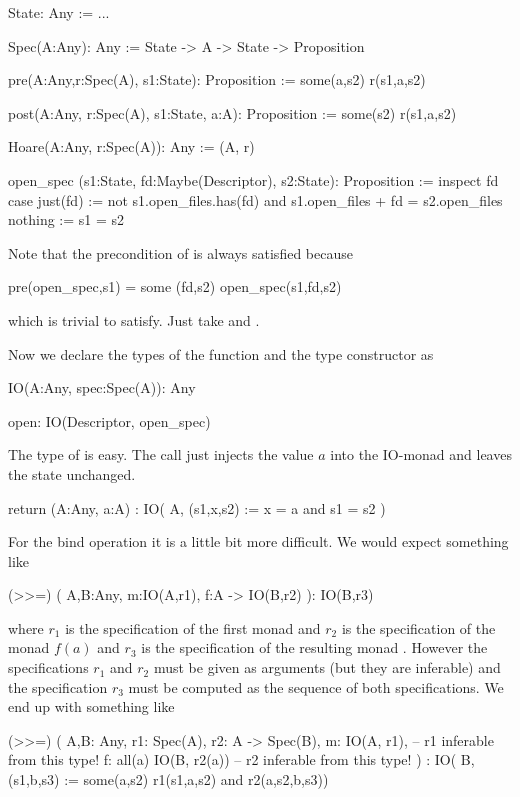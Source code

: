 \begin{alba}
  State: Any := ...

  Spec(A:Any): Any :=  State -> A -> State -> Proposition

  pre(A:Any,r:Spec(A), s1:State): Proposition :=
    some(a,s2) r(s1,a,s2)

  post(A:Any, r:Spec(A), s1:State, a:A): Proposition :=
    some(s2) r(s1,a,s2)


  Hoare(A:Any, r:Spec(A)): Any := (A, r)

  open_spec (s1:State, fd:Maybe(Descriptor), s2:State): Proposition :=
    inspect fd case
      just(fd) :=
        not s1.open_files.has(fd)
        and
        s1.open_files + fd = s2.open_files
      nothing :=
        s1 = s2
\end{alba}
Note that the precondition of  is always satisfied because
%
\begin{alba}
   pre(open_spec,s1) = some (fd,s2) open_spec(s1,fd,s2)
\end{alba}
%
which is trivial to satisfy. Just take  and .

Now we declare the types of the function  and the type constructor
 as
%
\begin{alba}
  IO(A:Any, spec:Spec(A)): Any

  open: IO(Descriptor, open_spec)
\end{alba}
%
The type of  is easy. The call  just injects the
value $a$ into the IO-monad and leaves the state unchanged.
%
\begin{alba}
  return (A:Any, a:A)
         : IO( A,
               (s1,x,s2) :=
                   x  = a and
                   s1 = s2 )
\end{alba}
%
For the bind operation it is a little bit more difficult. We would expect
something like
%
\begin{alba}
  (>>=) ( A,B:Any,
          m:IO(A,r1),
          f:A -> IO(B,r2)
        ): IO(B,r3)
\end{alba}
%
where $r_1$ is the specification of the first monad and $r_2$ is the
specification of the monad $f(a)$ and $r_3$ is the specification of the
resulting monad . However the specifications $r_1$ and $r_2$
must be given as arguments (but they are inferable) and the specification
$r_3$ must be computed as the sequence of both specifications. We end up with
something like

%
\begin{alba}
  (>>=) ( A,B: Any, r1: Spec(A), r2: A -> Spec(B),
          m: IO(A, r1),       -- r1 inferable from this type!
          f: all(a)
               IO(B, r2(a))   -- r2 inferable from this type!
        )
        : IO( B,
              (s1,b,s3) :=
                  some(a,s2)
                    r1(s1,a,s2) and
                    r2(a,s2,b,s3))
\end{alba}
%


